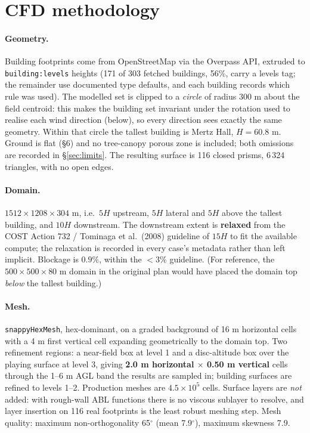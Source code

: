 \documentclass[11pt,letterpaper]{article}
\begin{document}
\section{CFD methodology}

\paragraph{Geometry.} Building footprints come from OpenStreetMap via the
Overpass API, extruded to \texttt{building:levels} heights (171 of 303 fetched
buildings, 56\%, carry a levels tag; the remainder use documented type
defaults, and each building records which rule was used). The modelled set is
clipped to a \emph{circle} of radius 300 m about the field centroid: this makes
the building set invariant under the rotation used to realise each wind
direction (below), so every direction sees exactly the same geometry. Within
that circle the tallest building is Mertz Hall, $H = 60.8$ m. Ground is flat
(\S6) and no tree-canopy porous zone is included; both omissions are recorded
in \S\ref{sec:limits}. The resulting surface is 116 closed prisms, 6\,324
triangles, with no open edges.

\paragraph{Domain.} $1512 \times 1208 \times 304$ m, i.e.\ $5H$ upstream,
$5H$ lateral and $5H$ above the tallest building, and $10H$ downstream.
The downstream extent is \textbf{relaxed} from the COST Action 732 /
Tominaga et al.\ (2008) guideline of $15H$ to fit the available compute; the
relaxation is recorded in every case's metadata rather than left implicit.
Blockage is $0.9\%$, within the $<3\%$ guideline. (For reference, the
$500\times500\times80$ m domain in the original plan would have placed the
domain top \emph{below} the tallest building.)

\paragraph{Mesh.} \texttt{snappyHexMesh}, hex-dominant, on a graded background
of 16 m horizontal cells with a 4 m first vertical cell expanding geometrically
to the domain top. Two refinement regions: a near-field box at level 1 and a
disc-altitude box over the playing surface at level 3, giving
\textbf{2.0 m horizontal $\times$ 0.50 m vertical} cells through the
1--6 m AGL band the results are sampled in; building surfaces are refined to
levels 1--2. Production meshes are $4.5\times10^{5}$ cells. Surface layers are
\emph{not} added: with rough-wall ABL functions there is no viscous sublayer to
resolve, and layer insertion on 116 real footprints is the least robust meshing
step. Mesh quality: maximum non-orthogonality 65$^\circ$ (mean 7.9$^\circ$),
maximum skewness 7.9.
\end{document}
